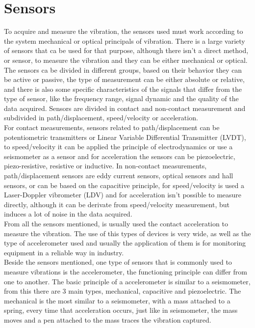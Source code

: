 \section{Sensors}
To acquire and measure the vibration, the sensors used must work according to the system mechanical or optical principals of vibration. There is a large variety of sensors that ca be used for that purpose, although there isn't a direct method, or sensor, to measure the vibration and they can be either mechanical or optical. The sensors ca be divided in different groups, based on their behavior they can be active or passive, the type of measurement can be either absolute or relative, and there is also some specific characteristics of the signals that differ from the type of sensor, like the frequency range, signal dynamic and the quality of the data acquired. Sensors are divided in contact and non-contact measurement and subdivided in path/displacement, speed/velocity or acceleration.\\
For contact measurements, sensors related to path/displacement can be potentiometric transmitters or Linear Variable Differential Transmitter (LVDT), to speed/velocity it can be applied the principle of electrodynamics or use a seismometer as a sensor and for acceleration the sensors can be piezoelectric, piezo-resistive, resistive or inductive. In non-contact measurements, path/displacement sensors are eddy current sensors, optical sensors and hall sensors, or can be based on the capacitive principle, for speed/velocity is used a Laser-Doppler vibrometer (LDV) and for acceleration isn't possible to measure directly, although it can be derivate from speed/velocity measurement, but induces a lot of noise in the data acquired\cite{SensorsVibrationMeasurement}\cite{VibrationMeasurementVibration2019}.\\
From all the sensors mentioned, is usually used the contact acceleration to measure the vibration. The use of this types of devices is very wide, as well as the type of accelerometer used and usually the application of them is for monitoring equipment in a reliable way in industry.\\ 
Beside the sensors mentioned, one type of sensors that is commonly used to measure vibrations is the accelerometer, the functioning principle can differ from one to another. The basic principle of a accelerometer is similar to a seismometer, from this there are 3 main types, mechanical, capacitive and piezoelectric. The mechanical is the most similar to a seismometer, with a mass attached to a spring, every time that acceleration occurs, just like in seismometer, the mass moves and a pen attached to the mass traces the vibration captured.
